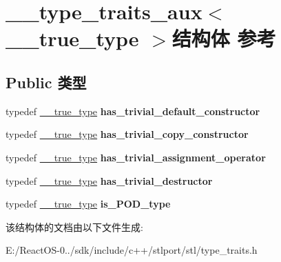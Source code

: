 \hypertarget{struct____type__traits__aux_3_01____true__type_01_4}{}\section{\+\_\+\+\_\+type\+\_\+traits\+\_\+aux$<$ \+\_\+\+\_\+true\+\_\+type $>$结构体 参考}
\label{struct____type__traits__aux_3_01____true__type_01_4}
\subsection*{Public 类型}
\begin{DoxyCompactItemize}
\item 
\mbox{\label{struct____type__traits__aux_3_01____true__type_01_4_a1109dc095fcf04e4baedabdef37e5469}} 
typedef \hyperlink{struct____true__type}{\+\_\+\+\_\+true\+\_\+type} {\bfseries has\+\_\+trivial\+\_\+default\+\_\+constructor}
\item 
\mbox{\label{struct____type__traits__aux_3_01____true__type_01_4_a9fcb208e3f8133e1797a01ea6bab633c}} 
typedef \hyperlink{struct____true__type}{\+\_\+\+\_\+true\+\_\+type} {\bfseries has\+\_\+trivial\+\_\+copy\+\_\+constructor}
\item 
\mbox{\label{struct____type__traits__aux_3_01____true__type_01_4_a27e25439105b2c26a410cdf6f024fa48}} 
typedef \hyperlink{struct____true__type}{\+\_\+\+\_\+true\+\_\+type} {\bfseries has\+\_\+trivial\+\_\+assignment\+\_\+operator}
\item 
\mbox{\label{struct____type__traits__aux_3_01____true__type_01_4_a54ab6cc0d7161957877ee41655f4a9bd}} 
typedef \hyperlink{struct____true__type}{\+\_\+\+\_\+true\+\_\+type} {\bfseries has\+\_\+trivial\+\_\+destructor}
\item 
\mbox{\label{struct____type__traits__aux_3_01____true__type_01_4_a3f0c819fc5c1e6796ef97176752177c3}} 
typedef \hyperlink{struct____true__type}{\+\_\+\+\_\+true\+\_\+type} {\bfseries is\+\_\+\+P\+O\+D\+\_\+type}
\end{DoxyCompactItemize}


该结构体的文档由以下文件生成\+:\begin{DoxyCompactItemize}
\item 
E\+:/\+React\+O\+S-\/0../sdk/include/c++/stlport/stl/type\+\_\+traits.\+h\end{DoxyCompactItemize}
